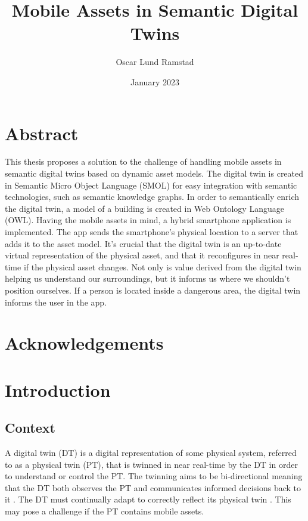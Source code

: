 \documentclass{article}
\begin{document}
\title{Mobile Assets in Semantic Digital Twins}
\author{Oscar Lund Ramstad}
\date{January 2023}

\duoforside[dept={Institute for Informatics}, program={Informatics: Programming and System Architecture}, short]

\section*{Abstract}
This thesis proposes a solution to the challenge of handling mobile assets in semantic digital twins based on dynamic asset models. The digital twin is created in Semantic Micro Object Language (SMOL) for easy integration with semantic technologies, such as semantic knowledge graphs. In order to semantically enrich the digital twin, a model of a building is created in Web Ontology Language (OWL).  Having the mobile assets in mind, a hybrid smartphone application is implemented. The app sends the smartphone's physical location to a server that adds it to the asset model. It's crucial that the digital twin is an up-to-date virtual representation of the physical asset, and that it reconfigures in near real-time if the physical asset changes. Not only is value derived from the digital twin helping us understand our surroundings, but it informs us where we shouldn't position ourselves. If a person is located inside a dangerous area, the digital twin informs the user in the app.

\newpage

\section*{Acknowledgements}
\newpage

\tableofcontents
\newpage

\listoftables
\newpage

\listoffigures
\newpage

\setcounter{page}{1}

\section{Introduction}
\subsection{Context}
A digital twin (DT) is a digital representation of some physical system, referred to as a physical twin (PT), that is twinned in near real-time by the DT in order to understand or control the PT. The twinning aims to be bi-directional meaning that the DT both observes the PT and communicates informed decisions back to it \cite{kamburjan_digital_2022}. The DT must continually adapt to correctly reflect its physical twin \cite{kamburjan_twinning-by-construction_2022}. This may pose a challenge if the PT contains mobile assets.
\end{document}
